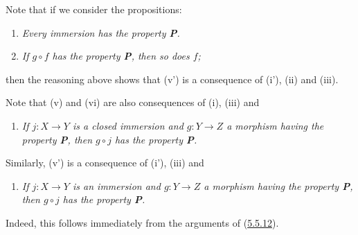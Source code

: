 \begin{remark}[5.5.12]
Note that if we consider the propositions:
\begin{enumerate}
  \item[\rm(i')] \emph{Every immersion has the property \textbf{P}.}
  \item[\rm(v')] \emph{If $g\circ f$ has the property \textbf{P}, then so
    does $f$;}
\end{enumerate}
then the reasoning above shows that (v') is a consequence of (i'),
(ii) and (iii).
\end{remark}

\begin{env}[5.5.13]
\label{I.5.5.13}
Note that (v) and (vi) are also consequences of (i), (iii) and
\begin{enumerate}
  \item[\rm(ii')] \emph{If $j:X\to Y$ is a closed immersion and
    $g:Y\to Z$ a morphism having the property \textbf{P}, then
    $g\circ j$ has the property \textbf{P}.}
\end{enumerate}
Similarly, (v') is a consequence of (i'), (iii) and
\begin{enumerate}
  \item[\rm(ii'')] \emph{If $j:X\to Y$ is an immersion and $g:Y\to Z$ a
    morphism having the property \textbf{P}, then $g\circ j$ has the
    property \textbf{P}.}
\end{enumerate}
Indeed, this follows immediately from the arguments of
(\hyperref[I.5.5.12]{5.5.12}).
\end{env}
